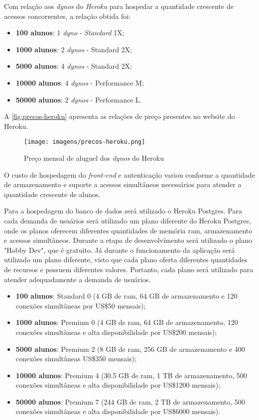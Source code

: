 Com relação aos \textit{\glspl{dyno}} do \textit{Heroku} para hospedar a quantidade crescente de acessos concorrentes, a relação obtida foi:
\begin{itemize}
    \item \textbf{100 alunos}: 1 \textit{\gls{dyno}} - \textit{Standard} 1X;
    \item \textbf{1000 alunos}: 2 \textit{\glspl{dyno}} - Standard 2X;
    \item \textbf{5000 alunos}: 4 \textit{\glspl{dyno}} - Standard 2X;
    \item \textbf{10000 alunos}: 4 \textit{\glspl{dyno}} - Performance M;
    \item \textbf{50000 alunos}: 2 \textit{\glspl{dyno}} - Performance L.
\end{itemize}

A \autoref{fig:precos-heroku} apresenta as relações de preço presentes no website do Heroku.

\begin{figure}[htb]
    \centering
	\texttt{[image: imagens/precos-heroku.png]}
	\caption{\label{fig:precos-heroku} Preço mensal de aluguel dos \textit{\glspl{dyno}} do Heroku}
\end{figure}

O custo de hospedagem do \textit{\gls{front-end}} e autenticação variou conforme a quantidade de armazenamento e suporte a acessos simultâneos necessários para atender a quantidade crescente de alunos.

Para a hospedagem do banco de dados será utilizado o Heroku Postgres. Para cada demanda de usuários será utilizado um plano diferente do Heroku Postgres, onde os planos oferecem diferentes quantidades de memória \ac{ram}, armazenamento e acessos simultâneos. Durante a etapa de desenvolvimento será utilizado o plano "Hobby Dev", que é gratuito. Já durante o funcionamento da aplicação será utilizado um plano diferente, visto que cada plano oferta diferentes quantidades de recursos e possuem diferentes valores. Portanto, cada plano será utilizado para atender adequadamente a demanda de usuários.

\begin{itemize}
    \item \textbf{100 alunos}: Standard 0 (4 GB de \ac{ram}, 64 GB de armazenamento e 120 conexões simultâneas por US\$50 mensais);
    \item \textbf{1000 alunos}: Premium 0 (4 GB de \ac{ram}, 64 GB de armazenamento, 120 conexões simultâneas e alta disponibilidade por US\$200 mensais);
    \item \textbf{5000 alunos}: Premium 2 (8 GB de \ac{ram}, 256 GB de armazenamento e 400 conexões simultâneas US\$350 mensais);
    \item \textbf{10000 alunos}: Premium 4 (30.5 GB de \ac{ram}, 1 TB de armazenamento, 500 conexões simultâneas e alta disponibilidade por US\$1200 mensais);
    \item \textbf{50000 alunos}: Premium 7 (244 GB de \ac{ram}, 2 TB de armazenamento, 500 conexões simultâneas e alta disponibilidade por US\$6000 mensais).
\end{itemize}